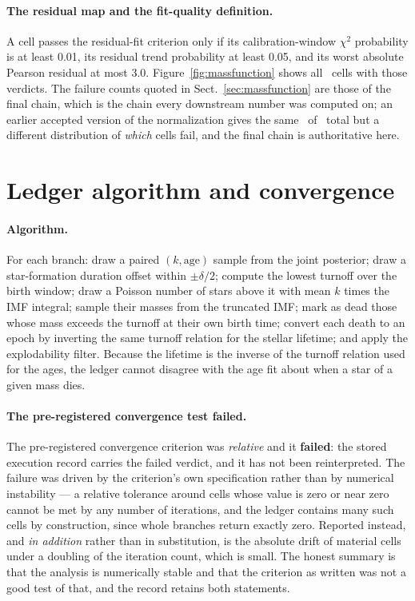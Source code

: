\documentclass{aa}
\begin{document}
\paragraph{The residual map and the fit-quality definition.}
A cell passes the residual-fit criterion only if its calibration-window $\chi^2$
probability is at least 0.01, its residual trend probability at least 0.05, and
its worst absolute Pearson residual at most 3.0. Figure~\ref{fig:massfunction}
shows all \gateCells\ cells with those verdicts. The failure counts quoted in
Sect.~\ref{sec:massfunction} are those of the final chain, which is the chain
every downstream number was computed on; an earlier accepted version of the
normalization gives the same \gatePassing\ of \gateCells\ total but a different
distribution of \emph{which} cells fail, and the final chain is authoritative
here.

\section{Ledger algorithm and convergence}\label{app:ledger}

\paragraph{Algorithm.}
For each branch: draw a paired $(k, \mathrm{age})$ sample from the joint
posterior; draw a star-formation duration offset within $\pm\delta/2$; compute
the lowest turnoff over the birth window; draw a Poisson number of stars above
it with mean $k$ times the IMF integral; sample their masses from the truncated
IMF; mark as dead those whose mass exceeds the turnoff at their own birth time;
convert each death to an epoch by inverting the same turnoff relation for the
stellar lifetime; and apply the explodability filter. Because the lifetime is
the inverse of the turnoff relation used for the ages, the ledger cannot
disagree with the age fit about when a star of a given mass dies.

\paragraph{The pre-registered convergence test failed.}
The pre-registered convergence criterion was \emph{relative} and it
\textbf{failed}: the stored execution record carries the failed verdict, and it
has not been reinterpreted. The failure was driven by the criterion's own
specification rather than by numerical instability --- a relative tolerance
around cells whose value is zero or near zero cannot be met by any number of
iterations, and the ledger contains many such cells by construction, since whole
branches return exactly zero. Reported instead, and \emph{in addition} rather
than in substitution, is the absolute drift of material cells under a doubling
of the iteration count, which is small. The honest summary is that the analysis
is numerically stable and that the criterion as written was not a good test of that,
and the record retains both statements.
\end{document}

